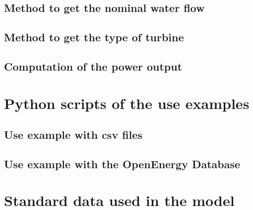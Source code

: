 \section{Method to get the nominal water flow}
\label{app:get_dV_n}



\section{Method to get the type of turbine}
\label{app:get_turb_type}



\section{Computation of the power output}
\label{app:powout}



\chapter{Python scripts of the use examples}

\section{Use example with csv files}
\label{app:ex_with_csv}



\section{Use example with the OpenEnergy Database}
\label{app:ex_with_oedb}




\chapter{Standard data used in the model}

